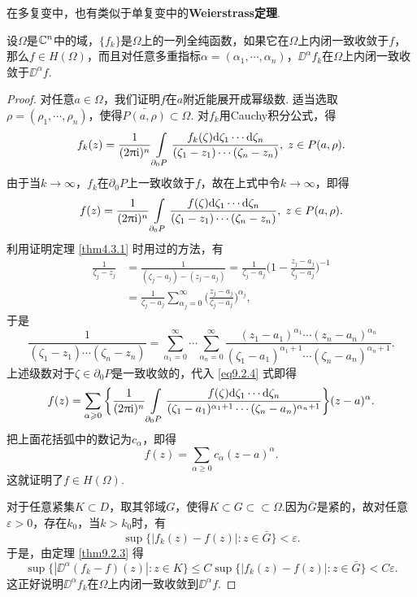 在多复变中，也有类似于单复变中的\textbf{Weierstrass定理}.
\begin{theorem}\label{thm9.2.4}
设$\Omega$是$\mathbb C^n$中的域，$\{f_k\}$是$\Omega$上的一列全纯函数，如果它在$\Omega$上内闭一致收敛于$f$，那么$f\in H(\Omega)$，而且对任意多重指标$\alpha=(\alpha_1,\cdots,\alpha_n)$，$\DD^\alpha f_k$在$\Omega$上内闭一致收敛于$\DD^\alpha f$.
\end{theorem}
\begin{proof}
对任意$a\in\Omega$，我们证明$f$在$a$附近能展开成幂级数. 适当选取$\rho=(\rho_1,\cdots,\rho_n)$，使得$\bar{P(a,\rho)}\subset\Omega$. 对$f_k$用Cauchy积分公式，得
\[f_k(z)=\frac1{(2\uppi\textrm i)^n}\int\limits_{\partial_0P}\frac{f_k(\zeta)\textrm d\zeta_1\cdots\textrm d\zeta_n}{(\zeta_1-z_1)\cdots(\zeta_n-z_n)},\;z\in P(a,\rho).\]
由于当$k\to\infty$，$f_k$在$\partial_0P$上一致收敛于$f$，故在上式中令$k\to\infty$，即得
\begin{equation}\label{eq9.2.4}
f(z)=\frac1{(2\uppi\textrm i)^n}\int\limits_{\partial_0P}\frac{f(\zeta)\textrm d\zeta_1\cdots\textrm d\zeta_n}{(\zeta_1-z_1)\cdots(\zeta_n-z_n)},\;z\in P(a,\rho).
\end{equation}
利用证明定理 \ref{thm4.3.1} 时用过的方法，有
\begin{align*}
\frac1{\zeta_j-z_j}&=\frac1{(\zeta_j-a_j)-(z_j-a_j)}
=\frac1{\zeta_j-a_j}\bigg(1-\frac{z_j-a_j}{\zeta_j-a_j}\bigg)^{-1}\\
&=\frac1{\zeta_j-a_j}\sum_{\alpha_j=0}^\infty\bigg(\frac{z_j-a_j}{\zeta_j-a_j}\bigg)
^{\alpha_j},
\end{align*}
于是
\[\frac1{(\zeta_1-z_1)\cdots(\zeta_n-z_n)}=\sum_{\alpha_1=0}^\infty\cdots
\sum_{\alpha_n=0}^\infty\frac{(z_1-a_1)^{\alpha_1}\cdots(z_n-a_n)^{\alpha_n}}
{(\zeta_1-a_1)^{\alpha_1+1}\cdots(\zeta_n-a_n)^{\alpha_n+1}}.\]
上述级数对于$\zeta\in\partial_0P$是一致收敛的，代入 \eqref{eq9.2.4} 式即得
\[f(z)=\sum_{\alpha\geqslant0}\bigg\{\frac1{(2\uppi\textrm i)^n}\int\limits_{\partial_0P}
\frac{f(\zeta)\textrm d\zeta_1\cdots\textrm d\zeta_n}
{(\zeta_1-a_1)^{\alpha_1+1}\cdots(\zeta_n-a_n)^{\alpha_n+1}}\bigg\}(z-a)^\alpha.\]
把上面花括弧中的数记为$c_\alpha$，即得
\[f(z)=\sum_{\alpha\ge0}c_\alpha(z-a)^\alpha.\]
这就证明了$f\in H(\Omega)$.

对于任意紧集$K\subset D$，取其邻域$G$，使得$K\subset G\subset\subset \Omega$.因为$\bar G$是紧的，故对任意$\varepsilon>0$，存在$k_0$，当$k>k_0$时，有
\[\sup\{|f_k(z)-f(z)|:z\in\bar G\}<\varepsilon.\]
于是，由定理 \ref{thm9.2.3} 得
\[\sup\{|\DD^\alpha(f_k-f)(z)|:z\in K\}\le C\sup\{|f_k(z)-f(z)|:z\in\bar G\}
<C\varepsilon.\]
这正好说明$\DD^\alpha f_k$在$\Omega$上内闭一致收敛到$\DD^\alpha f$.
\end{proof}

